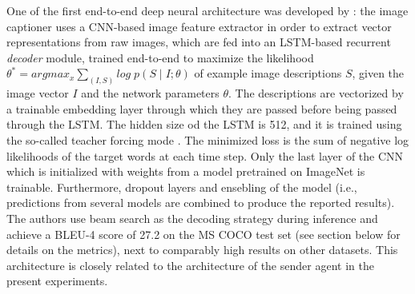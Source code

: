 One of the first end-to-end deep neural architecture was developed by \cite{vinyals2015show}: the image captioner uses a CNN-based image feature extractor in order to extract vector representations from raw images, which are fed into an LSTM-based recurrent \textit{decoder} module, trained end-to-end to maximize the likelihood $\theta^* = argmax_{x} \sum_{(I, S)} log\; p(S \mid I; \theta)$ of example image descriptions $S$, given the image vector $I$ and the network parameters $\theta$. The descriptions are vectorized by a trainable embedding layer through which they are passed before being passed through the LSTM.  The hidden size od the LSTM is 512, and it is trained using the so-called teacher forcing mode . The minimized loss is the sum of negative log likelihoods of the target words at each time step. Only the last layer of the CNN which is initialized with weights from a model pretrained on ImageNet is trainable. Furthermore, dropout layers and ensebling of the model (i.e., predictions from several models are combined to produce the reported results). The authors use beam search as the decoding strategy during inference and achieve a BLEU-4 score of 27.2 on the MS COCO test set (see section below  for details on the metrics), next to comparably high results on other datasets. 
This architecture is closely related to the architecture of the sender agent in the present experiments. 

